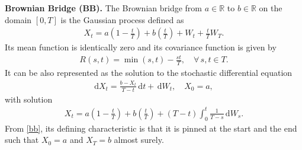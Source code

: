 \documentclass[runningheads]{llncs}
\newcommand{\mywrt}[1]{\, \mathrm{d} #1}
\begin{document}
   \noindent \textbf{Brownian Bridge (BB). }
   The Brownian bridge \cite{glasserman,Karatzas1987BrownianMA} from $a \in \mathbb{R}$ to $b \in \mathbb{R}$ on the domain $[0, T]$ is the Gaussian process defined as
   \begin{align} \label{bb}
   X_t = a \left( 1 - \frac{t}{T} \right) + b \left( \frac{t}{T} \right) + W_t + \frac{t}{T} W_T.
   \end{align}
   Its mean function is identically zero and its covariance function is given by 
   \begin{align} \label{BBCov}
   R(s, t) = \min(s, t) - \frac{st}{T}, \quad \forall \, s, t \in T.
   \end{align}
   It can be also represented as the solution to the stochastic differential equation \cite{Karatzas1987BrownianMA}
   \begin{align}
   \mathrm{d}X_t = \frac{b - X_t}{T-t} \mywrt{t} + \mywrt{W_t}, \quad X_0 = a,
   \end{align}
   with solution
   \begin{align}
   X_t = a \left( 1 - \frac{t}{T} \right) + b \left( \frac{t}{T} \right) + (T-t) \int_0^t \frac{1}{T-s} \mywrt{W_s}.
   \end{align}
   From \eqref{bb}, its defining characteristic is that it is pinned at the start and the end such that $X_0 = a$ and $X_T = b$ almost surely.
   
\end{document}
